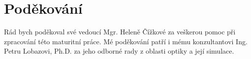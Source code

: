 \chapter*{Poděkování}

Rád bych poděkoval své vedoucí Mgr. Heleně Čížkové za veškerou pomoc při zpracování této maturitní práce. Mé poděkování patří i mému konzultantovi Ing. Petru Lobazovi, Ph.D. za jeho odborné rady z oblasti optiky a její simulace.
